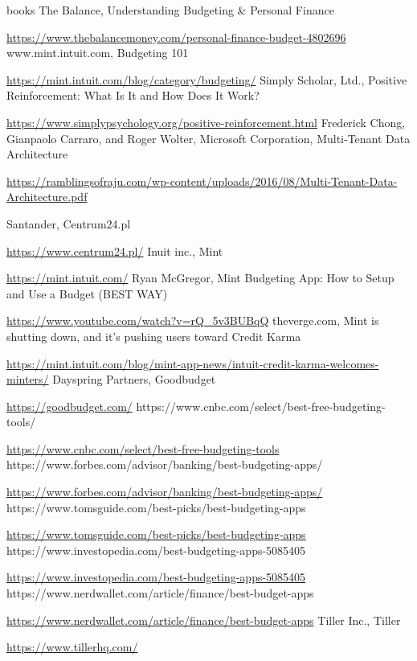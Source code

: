 \documentclass[a4paper,10pt, twoside]{report}
\begin{document}
\begin{large}
\begin{thebibliography} {books}
     The Balance, Understanding Budgeting \& Personal Finance\raggedright\url{
        https://www.thebalancemoney.com/personal-finance-budget-4802696}
     www.mint.intuit.com, Budgeting 101 \raggedright\url{
        https://mint.intuit.com/blog/category/budgeting/}
     Simply Scholar, Ltd., Positive Reinforcement: What Is It and How Does It Work? \raggedright\url{
        https://www.simplypsychology.org/positive-reinforcement.html}
     Frederick Chong, Gianpaolo Carraro, and Roger Wolter, Microsoft Corporation, Multi‐Tenant Data Architecture \raggedright\url{
        https://ramblingsofraju.com/wp-content/uploads/2016/08/Multi-Tenant-Data-Architecture.pdf}

     Santander, Centrum24.pl \raggedright\url{
        https://www.centrum24.pl/}
     Inuit inc., Mint \raggedright\url{
        https://mint.intuit.com/}
     Ryan McGregor, Mint Budgeting App: How to Setup and Use a Budget (BEST WAY) \raggedright\url{
        https://www.youtube.com/watch?v=rQ_5v3BUBqQ}
     theverge.com, Mint is shutting down, and it’s pushing users toward Credit Karma \raggedright\url{
        https://mint.intuit.com/blog/mint-app-news/intuit-credit-karma-welcomes-minters/}
     Dayspring Partners, Goodbudget \raggedright\url{
        https://goodbudget.com/}
     https://www.cnbc.com/select/best-free-budgeting-tools/ \raggedright\url{
        https://www.cnbc.com/select/best-free-budgeting-tools}
     https://www.forbes.com/advisor/banking/best-budgeting-apps/ \raggedright\url{
        https://www.forbes.com/advisor/banking/best-budgeting-apps/}
     https://www.tomsguide.com/best-picks/best-budgeting-apps \raggedright\url{
        https://www.tomsguide.com/best-picks/best-budgeting-apps}
     https://www.investopedia.com/best-budgeting-apps-5085405 \raggedright\url{
        https://www.investopedia.com/best-budgeting-apps-5085405}
     https://www.nerdwallet.com/article/finance/best-budget-apps \raggedright\url{
        https://www.nerdwallet.com/article/finance/best-budget-apps}
     Tiller Inc., Tiller \raggedright\url{
        https://www.tillerhq.com/}


\end{thebibliography}
\end{large}
\end{document}
